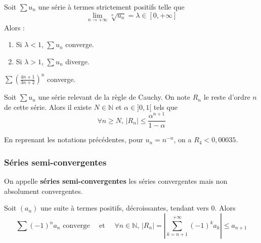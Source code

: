 
  \begin{proposition}
    Soit $\sum u_n$ une série à termes strictement positifs telle que
    \[ \lim_{n \rightarrow +\infty} \sqrt[n]{u_n} = \lambda \in [0, +\infty] \]
    Alors :
    \begin{enumerate}[label=(\roman*)]
      \item Si $\lambda < 1$, $\sum u_n$ converge.
      \item Si $\lambda > 1$, $\sum u_n$ diverge.
    \end{enumerate}
  \end{proposition}


  \begin{example}
    $\sum \left( \frac{4n+1}{3n+2} \right)^{n}$ converge.
  \end{example}


  \begin{proposition}
    Soit $\sum u_n$ une série relevant de la règle de Cauchy. On note $R_n$ le reste d'ordre $n$ de cette série. Alors il existe $N \in \mathbb{N}$ et $\alpha \in ]0,1[$ tels que
    \[ \forall n \geq N, \, |R_n| \leq \frac{\alpha^{n+1}}{1-\alpha} \]
  \end{proposition}

  \begin{example}
    En reprenant les notations précédentes, pour $u_n = n^{-n}$, on a $R_4 < 0,00035$.
  \end{example}

  \subsubsection{Séries semi-convergentes}


  \begin{definition}
    On appelle \textbf{séries semi-convergentes} les séries convergentes mais non absolument convergentes.
  \end{definition}

  \begin{theorem}
    Soit $(a_n)$ une suite à termes positifs, décroissantes, tendant vers $0$. Alors
    \[ \sum (-1)^n a_n \text{ converge} \quad \text{ et } \quad \forall n \in \mathbb{N}, \, |R_n| = \left| \sum_{k=n+1}^{+\infty} (-1)^k a_k \right| \leq a_{n+1} \]
  \end{theorem}

